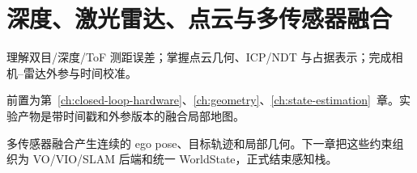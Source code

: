 \chapter{深度、激光雷达、点云与多传感器融合}
\label{ch:lidar-fusion}

\begin{learningobjectives}
理解双目/深度/ToF 测距误差；掌握点云几何、ICP/NDT 与占据表示；完成相机--雷达外参与时间校准。
\end{learningobjectives}

\begin{prerequisites}
前置为第~\ref{ch:closed-loop-hardware}、\ref{ch:geometry}、\ref{ch:state-estimation}~章。实验产物是带时间戳和外参版本的融合局部地图。
\end{prerequisites}


\begin{chaptertransition}
多传感器融合产生连续的 ego pose、目标轨迹和局部几何。下一章把这些约束组织为 VO/VIO/SLAM 后端和统一 WorldState，正式结束感知栈。
\end{chaptertransition}

